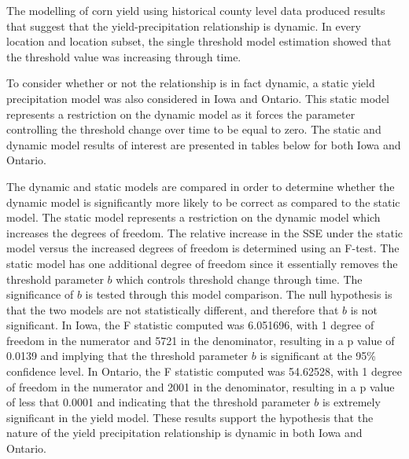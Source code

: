 The modelling of corn yield using historical county level data produced results that suggest that the yield-precipitation relationship is dynamic. In every location and location subset, the single threshold model estimation showed that the threshold value was increasing through time. 

To consider whether or not the relationship is in fact dynamic, a static yield precipitation model was also considered in Iowa and Ontario. This static model represents a restriction on the dynamic model as it forces the parameter controlling the threshold change over time to be equal to zero. The static and dynamic model results of interest are presented in tables below for both Iowa and Ontario. 


The dynamic and static models are compared in order to determine whether the dynamic model is significantly more likely to be correct as compared to the static model. The static model represents a restriction on the dynamic model which increases the degrees of freedom. The relative increase in the SSE under the static model versus the increased degrees of freedom is determined using an F-test. The static model has one additional degree of freedom since it essentially removes the threshold parameter $b$ which controls threshold change through time. The significance of $b$ is tested through this model comparison. The null hypothesis is that the two models are not statistically different, and therefore that $b$ is not significant. In Iowa, the F statistic computed was 6.051696, with 1 degree of freedom in the numerator and 5721 in the denominator, resulting in a p value of 0.0139 and implying that the threshold parameter $b$ is significant at the 95\% confidence level. In Ontario, the F statistic computed was  54.62528, with 1 degree of freedom in the numerator and 2001 in the denominator, resulting in a p value of less that 0.0001 and indicating that the threshold parameter $b$ is extremely significant in the yield model. These results support the hypothesis that the nature of the yield precipitation relationship is dynamic in both Iowa and Ontario.




